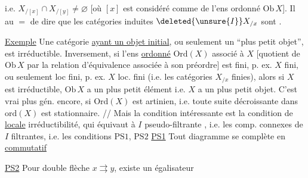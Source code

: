 i.e. $X_{/[x]}\cap X_{/[y]}\ne\varnothing$ [où $[x]$ est   considéré comme   de l'ens ordonné $\mathrm{Ob}\,X$].
Il  au $=$ de dire que les catégories induites $\deleted{\unsure{I}}X_{/x}$ sont .

 \uline{Exemple} Une catégorie \uline{ayant un objet initial}, ou seulement un ``plus petit objet'', est irréductible.
Inversement, si l'ens \uline{ordonné} $\mathrm{Ord}(X)$ associé à $X$ [quotient de $\mathrm{Ob}\,X$ par la relation d'équivalence associée à son préordre] est fini, p. ex. $X$ fini,  ou seulement loc fini, p. ex. $X$ loc. fini (i.e. les catégories $X_{/x}$ finies), alors si $X$ est irréductible, $\mathrm{Ob}\,X$ a un plus petit élément i.e. $X$ a un plus petit objet.
C'est vrai plus gén. encore, si $\mathrm{Ord}(X)$ est artinien, i.e.  toute suite décroissante dans $\mathrm{ord}(X)$ est stationnaire. //
Mais la condition intéressante est la condition  de \uline{locale} irréductibilité, qui équivaut à $I$ pseudo-filtrante , i.e. les comp. connexes de $I$ filtrantes, i.e. les conditions $\mathrm{PS}1$, $\mathrm{PS}2$
\uline{PS1} Tout diagramme
se complète en
\uline{commutatif}

\uline{PS2} Pour  double flèche $x\rightrightarrows y$, existe un égalisateur
